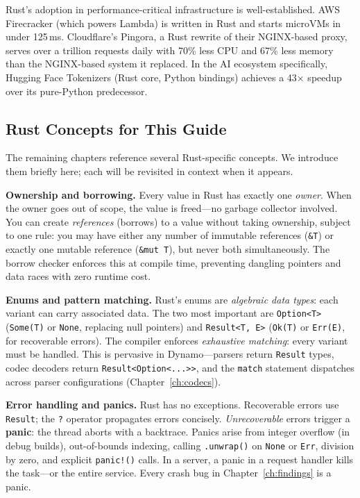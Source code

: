 \begin{notebox}
Rust's adoption in performance-critical infrastructure is well-established. AWS Firecracker (which powers Lambda) is written in Rust and starts microVMs in under 125\,ms. Cloudflare's Pingora, a Rust rewrite of their NGINX-based proxy, serves over a trillion requests daily with 70\% less CPU and 67\% less memory than the NGINX-based system it replaced. In the AI ecosystem specifically, Hugging Face Tokenizers (Rust core, Python bindings) achieves a 43$\times$ speedup over its pure-Python predecessor.
\end{notebox}

\subsection{Rust Concepts for This Guide}

The remaining chapters reference several Rust-specific concepts. We introduce them briefly here; each will be revisited in context when it appears.

\textbf{Ownership and borrowing.}\hspace{1em} Every value in Rust has exactly one \emph{owner}. When the owner goes out of scope, the value is freed---no garbage collector involved. You can create \emph{references} (borrows) to a value without taking ownership, subject to one rule: you may have either any number of immutable references (\texttt{\&T}) or exactly one mutable reference (\texttt{\&mut T}), but never both simultaneously. The borrow checker enforces this at compile time, preventing dangling pointers and data races with zero runtime cost.

\textbf{Enums and pattern matching.}\hspace{1em} Rust's enums are \emph{algebraic data types}: each variant can carry associated data. The two most important are \texttt{Option<T>} (\texttt{Some(T)} or \texttt{None}, replacing null pointers) and \texttt{Result<T, E>} (\texttt{Ok(T)} or \texttt{Err(E)}, for recoverable errors). The compiler enforces \emph{exhaustive matching}: every variant must be handled. This is pervasive in Dynamo---parsers return \texttt{Result} types, codec decoders return \texttt{Result<Option<...>{}>}, and the \texttt{match} statement dispatches across parser configurations (Chapter~\ref{ch:codecs}).

\textbf{Error handling and panics.}\hspace{1em} Rust has no exceptions. Recoverable errors use \texttt{Result}; the \texttt{?} operator propagates errors concisely. \emph{Unrecoverable} errors trigger a \textbf{panic}: the thread aborts with a backtrace. Panics arise from integer overflow (in debug builds), out-of-bounds indexing, calling \texttt{.unwrap()} on \texttt{None} or \texttt{Err}, division by zero, and explicit \texttt{panic!()} calls. In a server, a panic in a request handler kills the task---or the entire service. Every crash bug in Chapter~\ref{ch:findings} is a panic.

